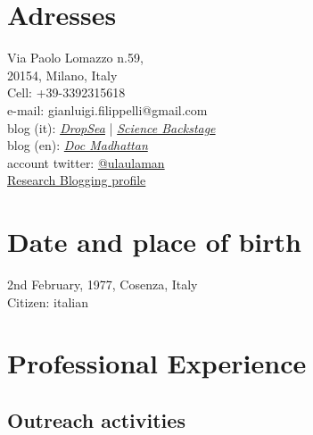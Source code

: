 \section{Adresses}

\begin{flushleft}
  Via Paolo Lomazzo n.59,\\
  20154, Milano, Italy\\ 
  Cell: +39-3392315618\\
  e-mail: gianluigi.filippelli@gmail.com\\
  blog (it): \href{http://dropseaofulaula.blogspot.it/}{\em DropSea} | \href{http://sciencebackstage.blogspot.it/}{\em Science Backstage}\\
  blog (en): \href{http://docmadhattan.fieldofscience.com/}{\em Doc Madhattan}\\
  account twitter: \href{https://twitter.com/ulaulaman}{@ulaulaman}\\
  \href{http://researchblogging.org/blogger/home/id/2181}{Research Blogging profile}
\end{flushleft}

\section{Date and place of birth}
\begin{flushleft}
  2nd February, 1977, Cosenza, Italy\\
  Citizen: italian
\end{flushleft}

\section{Professional Experience}
\subsection*{Outreach activities}

